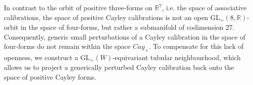 \documentclass[psamsfonts]{amsart}
\theoremstyle{plain}
\theoremstyle{definition}{
\newtheorem{defi}{Definition}[section]
\newtheorem{ass}{Assumption}
\newtheorem*{nota}{Notation}}
\theoremstyle{remark}{
\newtheorem{rem}{Remark}
\newtheorem{ex}{Example}}
\theoremstyle{plain}{
\newtheorem{thm}{Theorem}[section]
\newtheorem{lem}{Lemma}[section]
\newtheorem{cor}{Corollary}[section]
\newtheorem{prop}{Proposition}[section]
\newtheorem{con}{Conjecture}[section]}
\newcommand{\m}[1]{{\mathrm{#1}}}
\begin{document}








In contrast to the orbit of positive three-forms on $\mathbb{R}^7$, i.e. the space of associative calibrations, the space of positive Cayley calibrations is not an open $\mathrm{GL}_+(8,\mathbb{R})$-orbit in the space of four-forms, but rather a submanifold of codimension 27. Consequently, generic small perturbations of a Cayley calibration in the space of four-forms do not remain within the space $Cay_+$. To compensate for this lack of openness, we construct a $\mathrm{GL}_+(W)$-equivariant tubular neighbourhood, which allows us to project a generically perturbed Cayley calibration back onto the space of positive Cayley forms.\\
\end{document}
